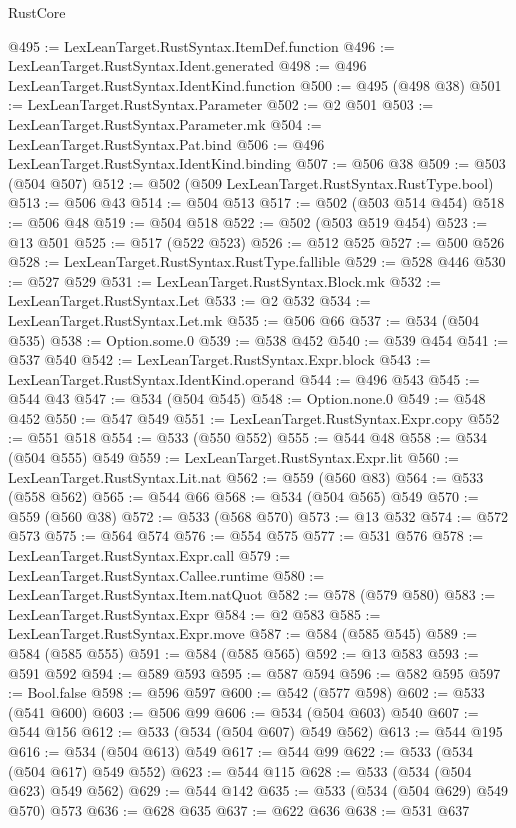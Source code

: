 \begin{lexlean}{RustCore}
\begin{coremodule}
@495 := LexLeanTarget.RustSyntax.ItemDef.function
@496 := LexLeanTarget.RustSyntax.Ident.generated
@498 := @496 LexLeanTarget.RustSyntax.IdentKind.function
@500 := @495 (@498 @38)
@501 := LexLeanTarget.RustSyntax.Parameter
@502 := @2 @501
@503 := LexLeanTarget.RustSyntax.Parameter.mk
@504 := LexLeanTarget.RustSyntax.Pat.bind
@506 := @496 LexLeanTarget.RustSyntax.IdentKind.binding
@507 := @506 @38
@509 := @503 (@504 @507)
@512 := @502 (@509 LexLeanTarget.RustSyntax.RustType.bool)
@513 := @506 @43
@514 := @504 @513
@517 := @502 (@503 @514 @454)
@518 := @506 @48
@519 := @504 @518
@522 := @502 (@503 @519 @454)
@523 := @13 @501
@525 := @517 (@522 @523)
@526 := @512 @525
@527 := @500 @526
@528 := LexLeanTarget.RustSyntax.RustType.fallible
@529 := @528 @446
@530 := @527 @529
@531 := LexLeanTarget.RustSyntax.Block.mk
@532 := LexLeanTarget.RustSyntax.Let
@533 := @2 @532
@534 := LexLeanTarget.RustSyntax.Let.mk
@535 := @506 @66
@537 := @534 (@504 @535)
@538 := Option.some.{0}
@539 := @538 @452
@540 := @539 @454
@541 := @537 @540
@542 := LexLeanTarget.RustSyntax.Expr.block
@543 := LexLeanTarget.RustSyntax.IdentKind.operand
@544 := @496 @543
@545 := @544 @43
@547 := @534 (@504 @545)
@548 := Option.none.{0}
@549 := @548 @452
@550 := @547 @549
@551 := LexLeanTarget.RustSyntax.Expr.copy
@552 := @551 @518
@554 := @533 (@550 @552)
@555 := @544 @48
@558 := @534 (@504 @555) @549
@559 := LexLeanTarget.RustSyntax.Expr.lit
@560 := LexLeanTarget.RustSyntax.Lit.nat
@562 := @559 (@560 @83)
@564 := @533 (@558 @562)
@565 := @544 @66
@568 := @534 (@504 @565) @549
@570 := @559 (@560 @38)
@572 := @533 (@568 @570)
@573 := @13 @532
@574 := @572 @573
@575 := @564 @574
@576 := @554 @575
@577 := @531 @576
@578 := LexLeanTarget.RustSyntax.Expr.call
@579 := LexLeanTarget.RustSyntax.Callee.runtime
@580 := LexLeanTarget.RustSyntax.Item.natQuot
@582 := @578 (@579 @580)
@583 := LexLeanTarget.RustSyntax.Expr
@584 := @2 @583
@585 := LexLeanTarget.RustSyntax.Expr.move
@587 := @584 (@585 @545)
@589 := @584 (@585 @555)
@591 := @584 (@585 @565)
@592 := @13 @583
@593 := @591 @592
@594 := @589 @593
@595 := @587 @594
@596 := @582 @595
@597 := Bool.false
@598 := @596 @597
@600 := @542 (@577 @598)
@602 := @533 (@541 @600)
@603 := @506 @99
@606 := @534 (@504 @603) @540
@607 := @544 @156
@612 := @533 (@534 (@504 @607) @549 @562)
@613 := @544 @195
@616 := @534 (@504 @613) @549
@617 := @544 @99
@622 := @533 (@534 (@504 @617) @549 @552)
@623 := @544 @115
@628 := @533 (@534 (@504 @623) @549 @562)
@629 := @544 @142
@635 := @533 (@534 (@504 @629) @549 @570) @573
@636 := @628 @635
@637 := @622 @636
@638 := @531 @637

\end{coremodule}
\end{lexlean}
